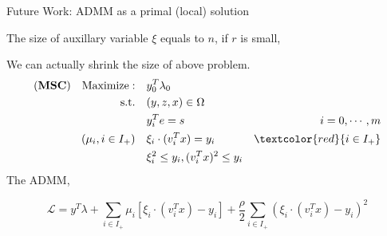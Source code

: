 \documentclass[aspectratio=1610, 10pt]{beamer}
\newcommand{\model}[1]{(\textbf{#1})}
\newcommand{\red}[1]{\textcolor{red}{#1}}
\begin{document}
\begin{frame}[allowframebreaks]{Future Work: ADMM as a primal (local) solution}
  \framebreak

  The size of auxillary variable \(\xi\) equals to \(n\), if \(r\) is small,

  We can actually shrink the size of above problem.
  \begin{align}
    \model{MSC} \quad \mathrm{Maximize: }\quad & y_0 ^T\lambda_0                                       \\
    \mathrm{s.t.} \quad                        & (y,z,x) \in \Omega                                    \\
                                               & y_i^Te = s                           & i=0, \cdots, m \\
    ( \mu_i, i\in I_+ )    \quad               & \xi_i \cdot (v_i^Tx) = y_i           & \red{i\in I_+} \\
                                               & \xi_i^2 \le y_i,  (v_i^Tx)^2 \le y_i
  \end{align}
  The ADMM,

  \begin{equation}
    \mathcal L = y^T\lambda + \sum_{i \in I_+} \mu_i \left [\xi_i \cdot(v_i^Tx) - y_i\right] + \frac{\rho}{2}\sum_{i \in I_+} (\xi_i \cdot (v_i^Tx) - y_i)^2
  \end{equation}

\end{frame}
\end{document}
